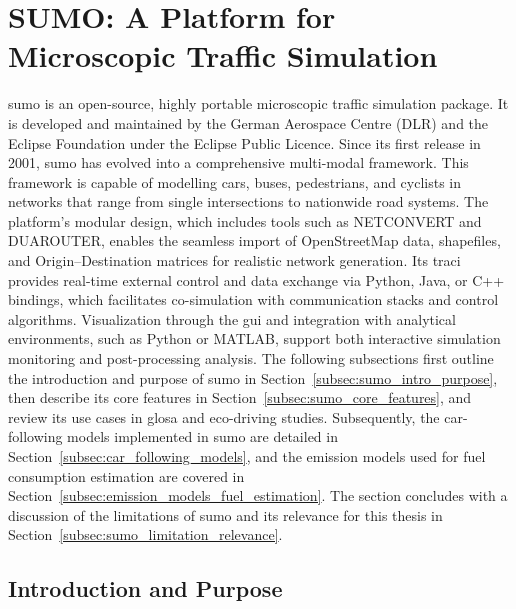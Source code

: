 \section{SUMO: A Platform for Microscopic Traffic Simulation}
\label{sec:SUMO}
\ac{sumo} is an open-source, highly portable microscopic traffic simulation package. It is developed and maintained by the German Aerospace Centre (DLR) and the Eclipse Foundation under the Eclipse Public Licence. \cite{SUMOWebsite2025, EclipseNews2017} Since its first release in 2001, \ac{sumo} has evolved into a comprehensive multi-modal framework. This framework is capable of modelling cars, buses, pedestrians, and cyclists in networks that range from single intersections to nationwide road systems. \cite{SUMODocs2025, Krajzewicz2002} The platform’s modular design, which includes tools such as NETCONVERT and DUAROUTER, enables the seamless import of OpenStreetMap data, shapefiles, and Origin–Destination matrices for realistic network generation. \cite{SUMODocs2025} Its \ac{traci} provides real-time external control and data exchange via Python, Java, or C++ bindings, which facilitates co-simulation with communication stacks and control algorithms. Visualization through the \ac{gui} and integration with analytical environments, such as Python or MATLAB, support both interactive simulation monitoring and post-processing analysis. \cite{TraCIDocs2024}
\mynewline
The following subsections first outline the introduction and purpose of \ac{sumo} in Section~\vref{subsec:sumo_intro_purpose}, then describe its core features in Section~\vref{subsec:sumo_core_features}, and review its use cases in \ac{glosa} and eco-driving studies. Subsequently, the car-following models implemented in \ac{sumo} are detailed in Section~\vref{subsec:car_following_models}, and the emission models used for fuel consumption estimation are covered in Section~\vref{subsec:emission_models_fuel_estimation}. The section concludes with a discussion of the limitations of \ac{sumo} and its relevance for this thesis in Section~\vref{subsec:sumo_limitation_relevance}.


\subsection{Introduction and Purpose}
\label{subsec:sumo_intro_purpose}

